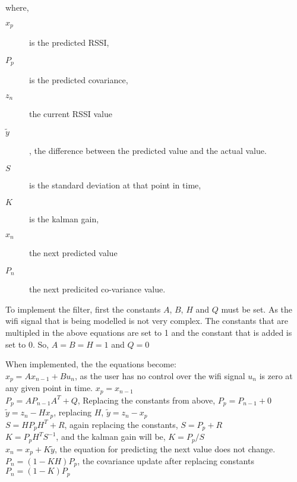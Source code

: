 \documentclass[a4paper,10pt]{article}
\begin{document}
where,
\begin{description}
 \item [$x_p$] is the predicted RSSI,
 \item [$P_p$] is the predicted covariance,
 \item [$z_n$] the current RSSI value
 \item [$\widetilde{y}$], the difference between the predicted value and the actual value.
 \item [$S$] is the standard deviation at that point in time,
 \item [$K$] is the kalman gain,
 \item [$x_n$] the next predicted value
 \item [$P_n$] the next predicited co-variance value.
\end{description}
To implement the filter, first the constants $A$, $B$, $H$ and $Q$ must be set. As the wifi signal that is being modelled is not very complex. The constants that are multipled in the above equations are set to 1 and the constant that is added is set to 0. So, $A = B = H = 1$ and $Q= 0$ 


When implemented, the the equations become:\\
$x_p = Ax_{n-1} + Bu_n $, as the user has no control over the wifi signal $u_n$ is zero at any given point in time. $x_p = x_{n-1}$\\
$P_p = AP_{n-1}A^T + Q $, Replacing the constants from above, $P_p = P_{n-1}+ 0 $\\
$\widetilde{y} = z_n - Hx_p $, replacing $H$, $\widetilde{y} = z_n - x_p $\\
$S = HP_pH^T +R$, again replacing the constants, $S = P_p +R $\\
$K = P_p H^TS^{-1} $, and the kalman gain will be, $K = P_p/S $\\
$x_n = x_p+K\widetilde{y} $, the equation for predicting the next value does not change.\\
$P_n = (1-KH)P_p$, the covariance update after replacing constants $P_n = (1-K)P_p$
\end{document}
